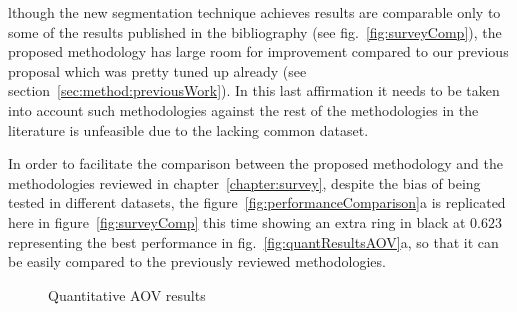 lthough the new segmentation technique achieves results are comparable only to some of the results published in the bibliography (see fig.~\ref{fig:surveyComp}), the proposed methodology has large room for improvement compared to our previous proposal which was pretty tuned up already (see section~\ref{sec:method:previousWork}). In this last affirmation it needs to be taken into account such methodologies against the rest of the methodologies in the literature is unfeasible due to the lacking common dataset. 



In order to facilitate the comparison between the proposed methodology and the methodologies reviewed in chapter~\ref{chapter:survey}, despite the bias of being tested in different datasets, the figure~\ref{fig:performanceComparison}a is replicated here in figure~\ref{fig:surveyComp} this time showing an extra ring in black at $0.623$ representing the best performance in fig.~\ref{fig:quantResultsAOV}a, so that it can be easily compared to the previously reviewed methodologies.


\begin{figure}[h]
  \centering
  
  \caption{Quantitative AOV results}
  \label{fig:surveyResults}
\end{figure}
